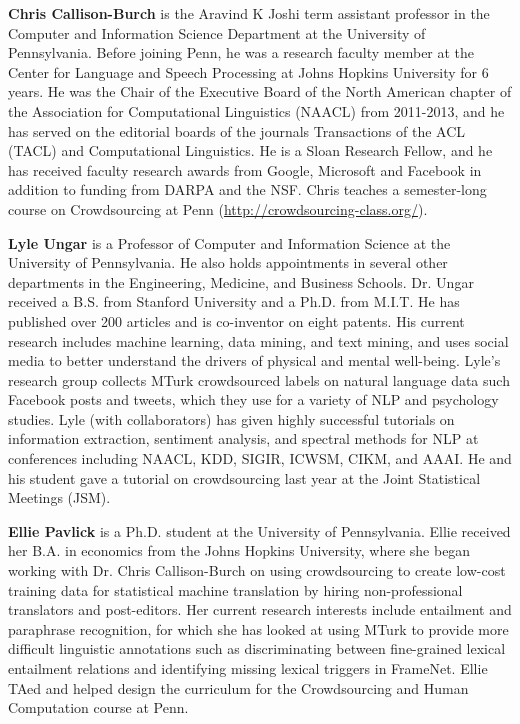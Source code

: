 \begin{bio}
{\bfseries Chris Callison-Burch} is the Aravind K Joshi term assistant
professor in the Computer and Information Science Department at the
University of Pennsylvania. Before joining Penn, he was a research
faculty member at the Center for Language and Speech Processing at
Johns Hopkins University for 6 years. He was the Chair of the
Executive Board of the North American chapter of the Association for
Computational Linguistics (NAACL) from 2011-2013, and he has served on
the editorial boards of the journals Transactions of the ACL (TACL)
and Computational Linguistics. He is a Sloan Research Fellow, and he
has received faculty research awards from Google, Microsoft and
Facebook in addition to funding from DARPA and the NSF. Chris teaches
a semester-long course on Crowdsourcing at Penn
(\url{http://crowdsourcing-class.org/}).

{\bfseries Lyle Ungar} is a Professor of Computer and Information Science at the University of Pennsylvania. He also holds appointments in several other departments in the Engineering, Medicine, and Business Schools. Dr. Ungar received a B.S. from Stanford University and a Ph.D. from M.I.T. He has published over 200 articles and is co-inventor on eight patents. His current research includes machine learning, data mining, and text mining, and uses social media to better understand the drivers of physical and mental well-being. Lyle’s research group collects MTurk crowdsourced labels on natural language data such Facebook posts and tweets, which they use for a variety of NLP and psychology studies. Lyle (with collaborators) has given highly successful tutorials on information extraction, sentiment analysis, and spectral methods for NLP at conferences including NAACL, KDD, SIGIR, ICWSM, CIKM, and AAAI. He and his student gave a tutorial on crowdsourcing last year at the Joint Statistical Meetings (JSM).

{\bfseries Ellie Pavlick} is a Ph.D. student at the University of Pennsylvania. Ellie received her B.A. in economics from the Johns Hopkins University, where she began working with Dr. Chris Callison-Burch on using crowdsourcing to create low-cost training data for statistical machine translation by hiring non-professional translators and post-editors. Her current research interests include entailment and paraphrase recognition, for which she has looked at using MTurk to provide more difficult linguistic annotations such as discriminating between fine-grained lexical entailment relations and identifying missing lexical triggers in FrameNet. Ellie TAed and helped design the curriculum for the Crowdsourcing and Human Computation course at Penn.
\end{bio}

